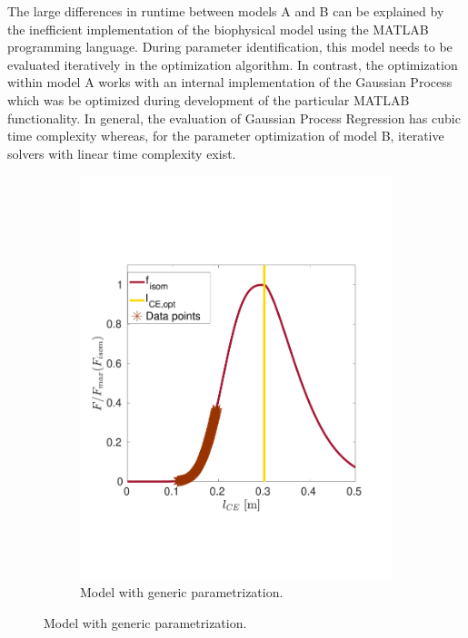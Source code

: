 The large differences in runtime between models A and B can be explained by the inefficient implementation of the biophysical model using the MATLAB programming language. During parameter identification, this model needs to be evaluated iteratively in the optimization algorithm. In contrast, the optimization within model A works with an internal implementation of the Gaussian Process which was be optimized during development of the particular MATLAB functionality.
In general, the evaluation of Gaussian Process Regression has cubic time complexity whereas, for the parameter optimization of model B, iterative solvers with linear time complexity exist.

\begin{figure}%
  \centering%
  \begin{subfigure}[t]{0.47\textwidth}%
    \centering%
    \includegraphics[width=\textwidth]{images/summer_school_study/biceps_initial.pdf}%
    \caption{Model with generic parametrization.}%
    \label{fig:biceps_a}%
  \end{subfigure}%

\end{figure}
